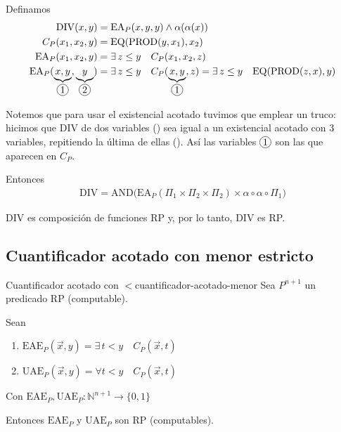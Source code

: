 Definamos
\begin{align*}
    \mathrm{DIV}(x,y) &= \mathrm{EA}_P (x,y,y) \wedge \alpha(\alpha(x))\\
    C_P(x_1, x_2, y) &= \mathrm{EQ}(\mathrm{PROD}(y, x_1), x_2) \\
    \mathrm{EA}_P (x_1, x_2, y) &= \exists \, z \leq y \quad C_P(x_1, x_2, z) \\
    \mathrm{EA}_P (\underbrace{x,y}_{\circled{1}},
    \underbrace{y}_{\circled{2}}) 
    &= \exists \, z \leq y \quad C_P(\underbrace{x,y}_{\circled{1}}, z) 
    = \exists \, z \leq y \quad \mathrm{EQ}(\mathrm{PROD}(z,x),y)
\end{align*}

Notemos que para usar el existencial acotado tuvimos que emplear un truco: 
hicimos que $\mathrm{DIV}$ de dos variables ()
sea igual a un existencial acotado con 3 variables, repitiendo la última de 
ellas ().
Así las variables $\circled{1}$ son las que aparecen en $C_P$.

\medskip

Entonces
\begin{gather*}
    \mathrm{DIV} = \mathrm{AND} \big(
    \mathrm{EA}_P(\Pi_1 \times \Pi_2 \times \Pi_2)
    \times \alpha \circ \alpha \circ \Pi_1 \big)
\end{gather*}

$\mathrm{DIV}$ es composición de funciones RP y, por lo tanto, $\mathrm{DIV}$ 
es RP.

\subsection{Cuantificador acotado con menor estricto}

\begin{teorema}{Cuantificador acotado con $<$}{cuantificador-acotado-menor}
    Sea $P^{n+1}$ un predicado RP (computable).

    Sean 
    \begin{enumerate}
        \item $\mathrm{EAE}_P (\overrightarrow{x},y) = \exists \, t < y \quad
            C_P (\overrightarrow{x},t)$
        \item $\mathrm{UAE}_P (\overrightarrow{x},y) = \forall t < y \quad
            C_P (\overrightarrow{x},t)$
    \end{enumerate}

    Con $\mathrm{EAE}_P, \mathrm{UAE}_P: \mathbb{N}^{n+1} \to \{ 0,1 \}$

    \medskip


    Entonces $\mathrm{EAE}_P$ y $\mathrm{UAE}_P$ son RP (computables).
\end{teorema}

